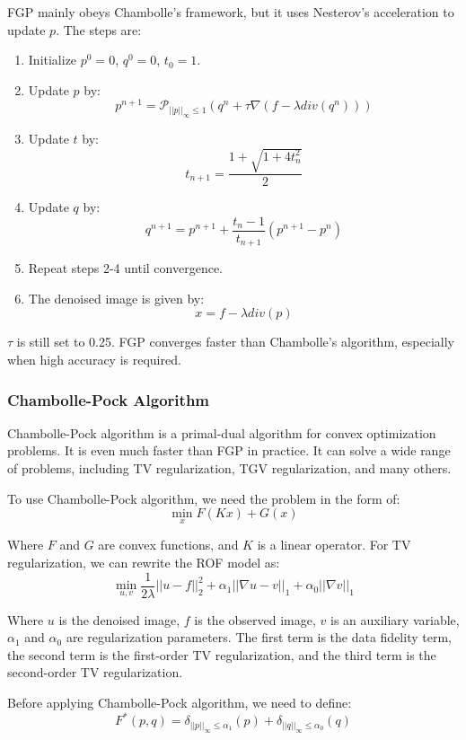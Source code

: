 \documentclass[12pt]{ctexart}
\begin{document}
FGP mainly obeys Chambolle's framework, but it uses Nesterov's acceleration to
update $p$. The steps are:
\begin{enumerate}
  \item Initialize $p^0 = 0$, $q^0 = 0$, $t_0 = 1$.
  \item Update $p$ by:
  \[
    p^{n+1} = \mathcal{P}_{||p||_\infty \leq 1}(q^{n} + \tau \nabla (f - \lambda div(q^n)))
  \]
  \item Update $t$ by:
  \[
    t_{n+1} = \frac{1 + \sqrt{1 + 4t_n^2}}{2}
  \]
  \item Update $q$ by:
  \[
    q^{n+1} = p^{n+1} + \frac{t_n - 1}{t_{n+1}}(p^{n+1} - p^n)
  \]
  \item Repeat steps 2-4 until convergence.
  \item The denoised image is given by:
  \[
    x = f - \lambda div(p)
  \]
\end{enumerate}

$\tau$ is still set to 0.25. FGP converges faster than Chambolle's algorithm,
especially when high accuracy is required.

\subsubsection{\textbf{Chambolle-Pock Algorithm}}

Chambolle-Pock algorithm is a primal-dual algorithm for convex optimization
problems. It is even much faster than FGP in practice. It can solve a wide range of
problems, including TV regularization, TGV regularization, and many others.

To use Chambolle-Pock algorithm, we need the problem in the form of:
\[
  \min_x F(Kx) + G(x)
\]

Where $F$ and $G$ are convex functions, and $K$ is a linear operator. For TV
regularization, we can rewrite the ROF model as:
\[
  \min_{u,v} \frac{1}{2\lambda} ||u - f||_2^2 + \alpha_1 ||\nabla u - v||_1 +
  \alpha_0 ||\nabla v||_1
\]

Where $u$ is the denoised image, $f$ is the observed image, $v$ is an auxiliary
variable, $\alpha_1$ and $\alpha_0$ are regularization parameters. The first term
is the data fidelity term, the second term is the first-order TV regularization, and
the third term is the second-order TV regularization.

Before applying Chambolle-Pock algorithm, we need to define:
\[
  F^{*}(p, q) = \delta_{||p||_\infty \leq \alpha_1}(p) + \delta_{||q||_\infty \leq
  \alpha_0}(q)
\]
\end{document}
